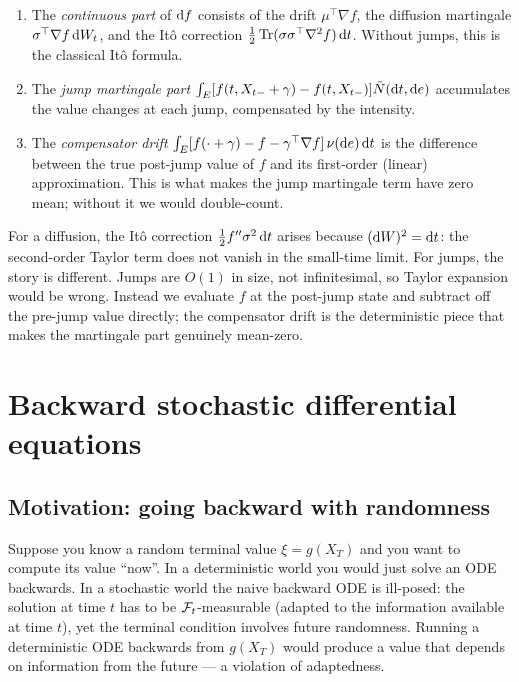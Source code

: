 \begin{enumerate}[leftmargin=2em]
  \item The \emph{continuous part} of $\mathrm{d} f$ consists of the drift $\mu^\top \nabla f$, the diffusion martingale $\sigma^\top \nabla f \, \mathrm{d} W_t$, and the It\^o correction $\tfrac{1}{2} \operatorname{Tr}(\sigma \sigma^\top \nabla^2 f) \, \mathrm{d} t$. Without jumps, this is the classical It\^o formula.
  \item The \emph{jump martingale part} $\int_E [f(t, X_{t-} + \gamma) - f(t, X_{t-})] \tilde N(\mathrm{d} t, \mathrm{d} e)$ accumulates the value changes at each jump, compensated by the intensity.
  \item The \emph{compensator drift} $\int_E [f(\cdot + \gamma) - f - \gamma^\top \nabla f] \, \nu(\mathrm{d} e) \, \mathrm{d} t$ is the difference between the true post-jump value of $f$ and its first-order (linear) approximation. This is what makes the jump martingale term have zero mean; without it we would double-count.
\end{enumerate}

\begin{intuition}
For a diffusion, the It\^o correction $\tfrac{1}{2} f'' \sigma^2 \, \mathrm{d} t$ arises because $(\mathrm{d} W)^2 = \mathrm{d} t$: the second-order Taylor term does not vanish in the small-time limit. For jumps, the story is different. Jumps are $O(1)$ in size, not infinitesimal, so Taylor expansion would be wrong. Instead we evaluate $f$ at the post-jump state and subtract off the pre-jump value directly; the compensator drift is the deterministic piece that makes the martingale part genuinely mean-zero.
\end{intuition}

\section{Backward stochastic differential equations}
\label{sec:bsde}

\subsection{Motivation: going backward with randomness}

Suppose you know a random terminal value $\xi = g(X_T)$ and you want to compute its value ``now''. In a deterministic world you would just solve an ODE backwards. In a stochastic world the naive backward ODE is ill-posed: the solution at time $t$ has to be $\mathcal{F}_t$-measurable (adapted to the information available at time $t$), yet the terminal condition involves future randomness. Running a deterministic ODE backwards from $g(X_T)$ would produce a value that depends on information from the future --- a violation of adaptedness.

